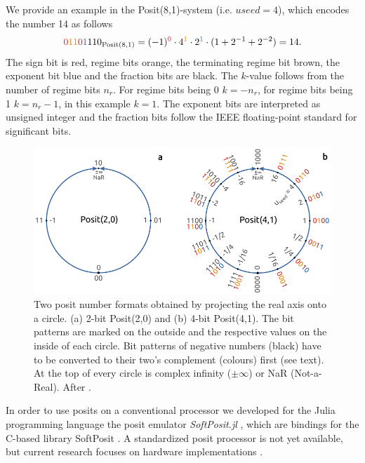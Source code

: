 \documentclass[draft]{agujournal2019}
\newcommand{\op}{\operatorname}
\begin{document}
We provide an example in the Posit(8,1)-system (i.e. $useed = 4$), which encodes
the number 14 as follows
\begin{equation}
{\color{psign}0}{\color{pregime}11}{\color{pregimet}0}{\color{pexpo}1}110_{\op{Posit}(8,1)}
= (-1)^{\color{psign}0} \cdot 4^{\color{pregime}1} \cdot 2^{\color{pexpo}1}
\cdot (1+2^{-1}+2^{-2}) = 14.
\label{eq:posit_pos}
\end{equation}
The sign bit is red, regime bits orange, the terminating regime bit brown, the
exponent bit blue and the fraction bits are black. The $k$-value
follows from the number of regime bits $n_r$. For regime bits being 0 $k=-n_r$,
for regime bits being 1 $k=n_r-1$, in this example $k=1$.
The exponent bits are interpreted as unsigned integer and the fraction
bits follow the IEEE floating-point standard for significant bits.

\begin{figure}[htbp]
\center
\includegraphics[width=1\textwidth]{circles.pdf}
\caption{Two posit number formats obtained by projecting the real axis onto a circle.
(a) 2-bit Posit(2,0) and (b) 4-bit Posit(4,1). The bit patterns are marked on the
outside and the respective values on the inside of each circle. Bit patterns of
negative numbers (black) have to be converted to their two's complement (colours)
first (see text). At the top of every circle is complex infinity ($\pm \infty$)
or NaR (Not-a-Real). After .}
\label{fig:circle}
\end{figure}

In order to use posits on a conventional processor we developed for the Julia
programming language \cite{Bezanson2017} the posit emulator \emph{SoftPosit.jl}
\cite{Klower2019a}, which are bindings for the C-based library SoftPosit \cite{Leong2020}.
A standardized posit processor is not yet available, but current research focuses
on hardware implementations \cite{Zhang2020,vanDam2019,Chen2018,Chaurasiya2018,Glaser2017}.
\end{document}
